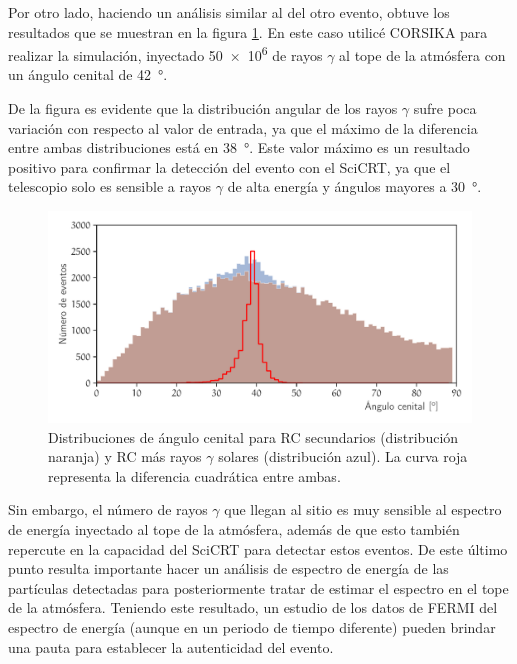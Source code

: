 Por otro lado, haciendo un análisis similar al del otro evento, obtuve los resultados que se muestran en la figura \ref{fig:sg-angular}. En este caso utilicé CORSIKA para realizar la simulación, inyectado \num{50e6} de rayos $\gamma$ al tope de la atmósfera con un ángulo cenital de \SI{42}{\degree}.

De la figura es evidente que la distribución angular de los rayos $\gamma$ sufre poca variación con respecto al valor de entrada, ya que el máximo de la diferencia entre ambas distribuciones está en \SI{38}{\degree}. Este valor máximo es un resultado positivo para confirmar la detección del evento con el SciCRT, ya que el telescopio solo es sensible a rayos $\gamma$ de alta energía y ángulos mayores a \SI{30}{\degree}.

\begin{figure}
        \centering
        \includegraphics[width=\textwidth]{solar-gammas-angular.pdf}
        \caption{Distribuciones de ángulo cenital para RC secundarios (distribución naranja) y RC más rayos $\gamma$ solares (distribución azul). La curva roja representa la diferencia cuadrática entre ambas.}
        \label{fig:sg-angular}
\end{figure}

Sin embargo, el número de rayos $\gamma$ que llegan al sitio es muy sensible al espectro de energía inyectado al tope de la atmósfera, además de que esto también repercute en la capacidad del SciCRT para detectar estos eventos. De este último punto resulta importante hacer un análisis de espectro de energía de las partículas detectadas para posteriormente tratar de estimar el espectro en el tope de la atmósfera. Teniendo este resultado, un estudio de los datos de FERMI del espectro de energía (aunque en un periodo de tiempo diferente) pueden brindar una pauta para establecer la autenticidad del evento.
